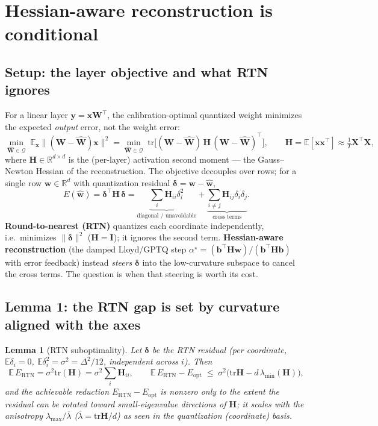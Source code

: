 \documentclass[11pt]{article}
\newtheorem{lemma}{Lemma}
\theoremstyle{remark}
\newcommand{\R}{\mathbb{R}}
\newcommand{\E}{\mathbb{E}}
\newcommand{\tr}{\mathrm{tr}}
\newcommand{\norm}[1]{\lVert #1 \rVert}
\newcommand{\Hm}{\bm H}
\newcommand{\wh}{\hat{\bm w}}
\begin{document}
\section{Hessian-aware reconstruction is conditional}
\label{sec:hessian}

\subsection{Setup: the layer objective and what RTN ignores}

For a linear layer $\bm y=\bm x\bm W^{\!\top}$, the calibration-optimal
quantized weight minimizes the expected \emph{output} error, not the weight
error:
\begin{equation}
\label{eq:obj}
\min_{\hat{\bm W}\in\mathcal Q}\;
\E_{\bm x}\big\|(\bm W-\hat{\bm W})\bm x\big\|^2
= \min_{\hat{\bm W}\in\mathcal Q}\;
\tr\!\big[(\bm W-\hat{\bm W})\,\Hm\,(\bm W-\hat{\bm W})^{\!\top}\big],
\qquad
\Hm=\E[\bm x\bm x^{\!\top}]\approx\tfrac1T \bm X^{\!\top}\bm X,
\end{equation}
where $\Hm\in\R^{d\times d}$ is the (per-layer) activation second moment --- the
Gauss--Newton Hessian of the reconstruction. The objective decouples over rows;
for a single row $\bm w\in\R^d$ with quantization residual
$\bm\delta=\bm w-\wh$,
\begin{equation}
\label{eq:E}
E(\wh)=\bm\delta^{\!\top}\Hm\,\bm\delta
      =\underbrace{\textstyle\sum_i \Hm_{ii}\delta_i^2}_{\text{diagonal / unavoidable}}
      +\underbrace{\textstyle\sum_{i\neq j}\Hm_{ij}\delta_i\delta_j}_{\text{cross terms}} .
\end{equation}
\textbf{Round-to-nearest (RTN)} quantizes each coordinate independently, i.e.\
minimizes $\norm{\bm\delta}^2$ ($\Hm{=}\bm I$); it ignores the second term.
\textbf{Hessian-aware reconstruction} (the damped Lloyd/GPTQ step
$\alpha^\star=(\bm b^{\!\top}\Hm\bm w)/(\bm b^{\!\top}\Hm\bm b)$ with error
feedback) instead \emph{steers} $\bm\delta$ into the low-curvature subspace to
cancel the cross terms. The question is when that steering is worth its cost.

\subsection{Lemma 1: the RTN gap is set by curvature aligned with the axes}

\begin{lemma}[RTN suboptimality]
\label{lem:gap}
Let $\bm\delta$ be the RTN residual (per coordinate, $\E\delta_i=0$,
$\E\delta_i^2=\sigma^2=\Delta^2/12$, independent across $i$). Then
\begin{equation}
\label{eq:gapmean}
\E\,E_{\mathrm{RTN}} = \sigma^2\tr(\Hm)
= \sigma^2\!\sum_i\Hm_{ii},
\qquad
\E\,E_{\mathrm{RTN}}-E_{\mathrm{opt}}
\;\le\; \sigma^2\big(\tr\Hm - d\,\lambda_{\min}(\Hm)\big),
\end{equation}
and the achievable reduction $E_{\mathrm{RTN}}-E_{\mathrm{opt}}$ is nonzero only
to the extent the residual can be rotated toward small-eigenvalue directions of
$\Hm$; it scales with the \emph{anisotropy} $\lambda_{\max}/\bar\lambda$
($\bar\lambda=\tr\Hm/d$) \emph{as seen in the quantization (coordinate) basis}.
\end{lemma}
\end{document}
